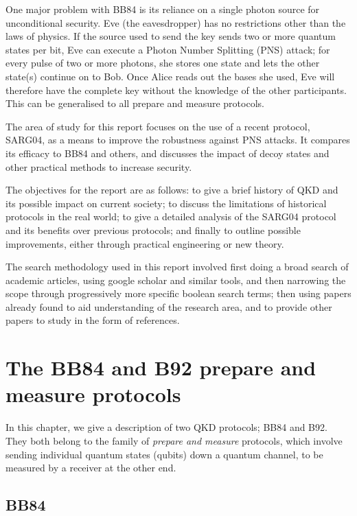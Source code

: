 \documentclass[paper=a4, fontsize=11pt]{scrartcl} %
\numberwithin{equation}{section} %
\numberwithin{figure}{section} %
\numberwithin{table}{section} %
\begin{document}
One major problem with BB84 is its reliance on a single photon source for unconditional security.
Eve (the eavesdropper) has no restrictions other than the laws of physics. If the source used to send the key sends two or more quantum
states per bit, Eve can execute a Photon Number Splitting (PNS) attack; for every pulse of two or more photons,
she stores one state and lets the other state(s) continue on to Bob. Once Alice reads out the bases she used, Eve
will therefore have the complete key without the knowledge of the other participants. This
can be generalised to all prepare and measure protocols.

The area of study for this report focuses on the use of a recent protocol, SARG04, as a means to improve the
robustness against PNS attacks. It compares its efficacy
to BB84 and others, and discusses the impact of decoy states and other practical methods to increase security.

The objectives for the report are as follows: to give a brief history of QKD and its possible impact on current
society; to discuss the limitations of historical protocols in the real world; to give a detailed analysis of the
SARG04 protocol and its benefits over previous protocols; and finally to outline possible improvements,
either through practical engineering or new theory.

The search methodology used in this report involved first doing a broad search of academic articles, using google scholar and similar
tools, and then narrowing the scope through progressively more specific boolean search terms; then using papers already found to aid understanding
of the research area, and to provide other papers to study in the form of references.

\clearpage
\section{The BB84 and B92 prepare and measure protocols}

In this chapter, we give a description of two QKD protocols; BB84 and B92.
They both belong to the family of \textit{prepare and measure} protocols, which
involve sending individual quantum states (qubits) down a quantum channel,
to be measured by a receiver at the other end.

\subsection{BB84}
\end{document}
